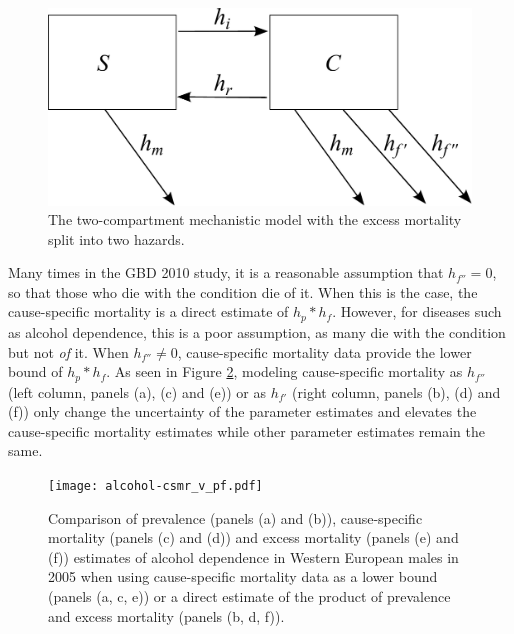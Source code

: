     \begin{figure}[h]
        \begin{center}
            \includegraphics[width=\textwidth]{SC2.pdf}
            \caption{The two-compartment mechanistic model with the excess mortality split into two hazards.}
            \label{fig:two_compartment_2f}
        \end{center}
    \end{figure}

Many times in the GBD 2010 study, it is a reasonable assumption that $h_{f''} = 0$, so that those who die with the condition die of it.  When this is the case, the cause-specific mortality is a direct estimate of $h_{p}*h_{f}$.  However, for diseases such as alcohol dependence, this is a poor assumption, as many die with the condition but not \emph{of} it.  When $h_{f''} \neq 0$, cause-specific mortality data provide the lower bound of $h_{p}*h_{f}$.  As seen in Figure \ref{fig:app-alcohol compare}, modeling cause-specific mortality as $h_{f''}$ (left column, panels (a), (c) and (e)) or as $h_{f'}$ (right column, panels (b), (d) and (f)) only change the uncertainty of the parameter estimates and elevates the cause-specific mortality estimates while other parameter estimates remain the same.

    \begin{figure}[h]
        \begin{center}
            \texttt{[image: alcohol-csmr\_v\_pf.pdf]}
            \caption{Comparison of prevalence (panels (a) and (b)), cause-specific mortality (panels (c) and (d)) and excess mortality (panels (e) and (f)) estimates of alcohol dependence in Western European males in 2005 when using cause-specific mortality data as a lower bound (panels (a, c, e)) or a direct estimate of the product of prevalence and excess mortality (panels (b, d, f)).}
            \label{fig:app-alcohol compare}
        \end{center}
    \end{figure} 